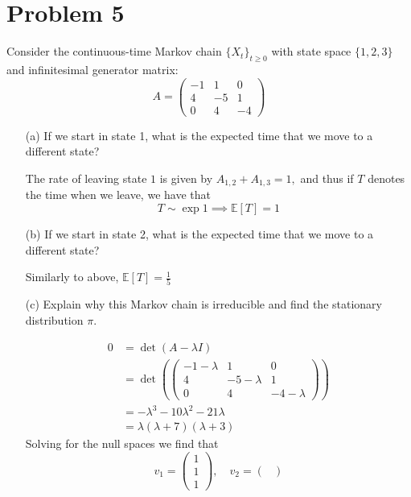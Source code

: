 \documentclass[11pt]{article}
\newcommand{\bbE}{\mathbb{E}}
\begin{document}
\newpage
\section*{Problem 5}
Consider the continuous-time Markov chain \(\{X_t\}_{t \geq 0}\) with state space \(\{1, 2, 3\}\) and infinitesimal generator matrix:
\[
A = \begin{pmatrix}
-1 & 1 & 0 \\
4 & -5 & 1 \\
0 & 4 & -4
\end{pmatrix}
\]

\begin{enumerate}
    \item[(a)] If we start in state 1, what is the expected time that we move to a different state?
    \begin{solution}
        The rate of leaving state $1$ is given by $A_{1,2} + A_{1,3} = 1,$ and thus if $T$ denotes the time when we leave, we have that \[T \sim \exp{1} \implies \bbE[T] = 1\]
    \end{solution}
    \item[(b)] If we start in state 2, what is the expected time that we move to a different state?
\begin{solution}
    Similarly to above, $\bbE[T] = \frac{1}{5}$
\end{solution}
    \item[(c)] Explain why this Markov chain is irreducible and find the stationary distribution \(\pi\).
\begin{solution}
    \begin{align*}
         0 &= \det(A - \lambda I)\\
         &= \det(\begin{pmatrix}
             -1 - \lambda & 1 & 0\\
             4 & -5 - \lambda & 1\\
             0 & 4 & -4 - \lambda
         \end{pmatrix})\\
         &= -\lambda^3 - 10\lambda^2 - 21\lambda \\
         &= \lambda(\lambda + 7)(\lambda +3)
    \end{align*}
    Solving for the null spaces we find that 
    \[v_1 = \begin{pmatrix}
        1\\1\\1
    \end{pmatrix}, \quad v_2 = \begin{pmatrix}

\end{pmatrix}\]
\end{solution}
\end{enumerate}
\end{document}
